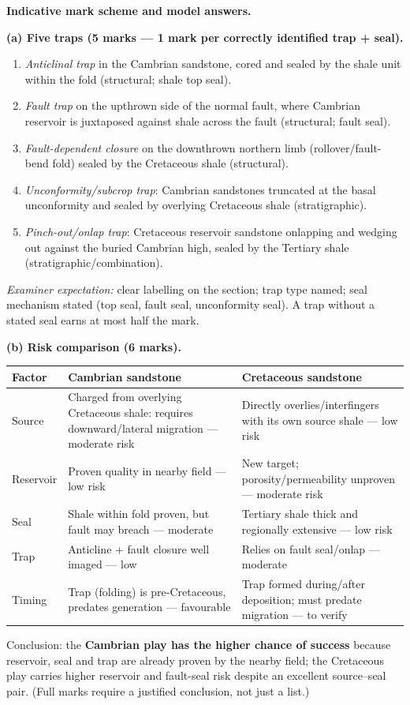 \documentclass[11pt]{article}
\begin{document}
\begin{corrige}
\textbf{Indicative mark scheme and model answers.}

\textbf{(a) Five traps (5 marks --- 1 mark per correctly identified trap + seal).}
\begin{enumerate}
\item \emph{Anticlinal trap} in the Cambrian sandstone, cored and sealed by the shale unit within the fold (structural; shale top seal).
\item \emph{Fault trap} on the upthrown side of the normal fault, where Cambrian reservoir is juxtaposed against shale across the fault (structural; fault seal).
\item \emph{Fault-dependent closure} on the downthrown northern limb (rollover/fault-bend fold) sealed by the Cretaceous shale (structural).
\item \emph{Unconformity/subcrop trap}: Cambrian sandstones truncated at the basal unconformity and sealed by overlying Cretaceous shale (stratigraphic).
\item \emph{Pinch-out/onlap trap}: Cretaceous reservoir sandstone onlapping and wedging out against the buried Cambrian high, sealed by the Tertiary shale (stratigraphic/combination).
\end{enumerate}
\emph{Examiner expectation:} clear labelling on the section; trap type named; seal mechanism stated (top seal, fault seal, unconformity seal). A trap without a stated seal earns at most half the mark.

\textbf{(b) Risk comparison (6 marks).}
\begin{center}
\begin{tabularx}{\linewidth}{|l|X|X|}\hline
\rowcolor{popblueL} Factor & Cambrian sandstone & Cretaceous sandstone \\ \hline
Source & Charged from overlying Cretaceous shale: requires downward/lateral migration --- moderate risk & Directly overlies/interfingers with its own source shale --- low risk \\
Reservoir & Proven quality in nearby field --- low risk & New target; porosity/permeability unproven --- moderate risk \\
Seal & Shale within fold proven, but fault may breach --- moderate & Tertiary shale thick and regionally extensive --- low risk \\
Trap & Anticline + fault closure well imaged --- low & Relies on fault seal/onlap --- moderate \\
Timing & Trap (folding) is pre-Cretaceous, predates generation --- favourable & Trap formed during/after deposition; must predate migration --- to verify \\ \hline
\end{tabularx}
\end{center}
Conclusion: the \textbf{Cambrian play has the higher chance of success} because reservoir, seal and trap are already proven by the nearby field; the Cretaceous play carries higher reservoir and fault-seal risk despite an excellent source--seal pair. (Full marks require a justified conclusion, not just a list.)


\end{corrige}
\end{document}
